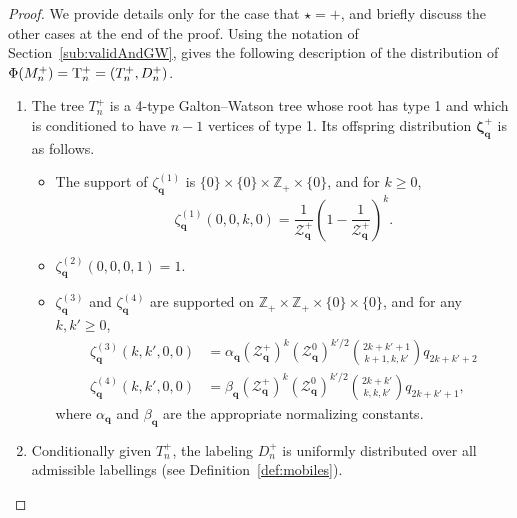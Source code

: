 \documentclass[AHL,Unicode,longabstracts,published]{cedram}
\newcommand{\bbZ}{\mathbb{Z}}
\newcommand{\bfq}{\mathbf{q}}
\newcommand{\cZ}{\mathcal{Z}}
\newcommand{\rT}{\mathrm{T}}
\begin{document}
\begin{proof}
We provide details only for the case that $\star=+$, and briefly discuss the other cases at the end of the proof. Using the notation of Section~\ref{sub:validAndGW}, \cite[Proposition~4.6]{CurienLeGallMiermontCactus} gives the following description of the distribution of $\Phi(M_n^+)\linebreak=\rT^+_n=(T^+_n,D^+_n)$.
\begin{enumerate}
\item \label{proofprop4.5.1} The tree $T^+_n$ is a 4-type Galton--Watson tree whose root has type 1 and which is conditioned to have $n-1$ vertices of type 1. Its offspring distribution $\bm{\zeta}^+_{\bfq}$ is as follows.
\begin{itemize}
\item The support of $\zeta^{(1)}_{\bfq}$ is $\{0\}\times\{0\}\times\bbZ_+\times\{0\}$, and for $k\geq 0$,
\[
\zeta^{(1)}_{\bfq}(0,0,k,0)=\frac{1}{\cZ_{\bfq}^+}\left(1-\frac{1}{\cZ_{\bfq}^+}\right)^k.
\]
\item $\zeta^{(2)}_{\bfq}(0,0,0,1)=1$.
\item $\zeta^{(3)}_{\bfq}$ and $\zeta^{(4)}_{\bfq}$ are supported on $\bbZ_+\times\bbZ_+\times\{0\}\times\{0\}$, and for any $k,k'\geq 0$,
\begin{align*}
\zeta^{(3)}_{\bfq}\left(k,k',0,0\right)&=\alpha_{\bfq}\left({\cZ_{\bfq}^+}\right)^k\left({\cZ_{\bfq}^0}\right)^{k'/2}\binom{2k+k'+1}{k+1,k,k'}q_{2k+k'+2}\\
\zeta^{(4)}_{\bfq}(k,k',0,0)&=\beta_{\bfq}\left({\cZ_{\bfq}^+}\right)^k\left({\cZ_{\bfq}^0}\right)^{k'/2}\binom{2k+k'}{k,k,k'}q_{2k+k'+1},
\end{align*}
where $\alpha_{\bfq}$ and $\beta_{\bfq}$ are the appropriate normalizing constants.
\end{itemize}
\item \label{proofprop4.5.2} Conditionally given $T^+_n$, the labeling $D^+_n$ is uniformly distributed over all admissible labellings (see Definition~\ref{def:mobiles}).
\end{enumerate}


\end{proof}
\end{document}
